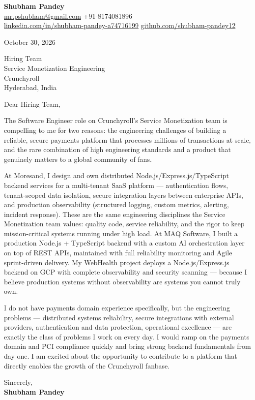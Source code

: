 \documentclass[a4paper,11pt]{article}
\begin{document}
\textbf{\Large Shubham Pandey}\\
\href{mailto:mr.pshubham@gmail.com}{mr.pshubham@gmail.com} \quad +91-8174081896\\
\href{https://www.linkedin.com/in/shubham-pandey-a74716199/}{linkedin.com/in/shubham-pandey-a74716199} \quad
\href{https://github.com/shubham-pandey12}{github.com/shubham-pandey12}

\vspace{1em}
October 30, 2026

\vspace{1em}
Hiring Team\\
Service Monetization Engineering\\
Crunchyroll\\
Hyderabad, India

\vspace{1em}
Dear Hiring Team,

The Software Engineer role on Crunchyroll's Service Monetization team is compelling to me for two reasons: the engineering challenges of building a reliable, secure payments platform that processes millions of transactions at scale, and the rare combination of high engineering standards and a product that genuinely matters to a global community of fans.

At Moresand, I design and own distributed Node.js/Express.js/TypeScript backend services for a multi-tenant SaaS platform --- authentication flows, tenant-scoped data isolation, secure integration layers between enterprise APIs, and production observability (structured logging, custom metrics, alerting, incident response). These are the same engineering disciplines the Service Monetization team values: quality code, service reliability, and the rigor to keep mission-critical systems running under high load. At MAQ Software, I built a production Node.js + TypeScript backend with a custom AI orchestration layer on top of REST APIs, maintained with full reliability monitoring and Agile sprint-driven delivery. My WebHealth project deploys a Node.js/Express.js backend on GCP with complete observability and security scanning --- because I believe production systems without observability are systems you cannot truly own.

I do not have payments domain experience specifically, but the engineering problems --- distributed systems reliability, secure integrations with external providers, authentication and data protection, operational excellence --- are exactly the class of problems I work on every day. I would ramp on the payments domain and PCI compliance quickly and bring strong backend fundamentals from day one. I am excited about the opportunity to contribute to a platform that directly enables the growth of the Crunchyroll fanbase.

\vspace{1em}
Sincerely,\\[0.5em]
\textbf{Shubham Pandey}
\end{document}
